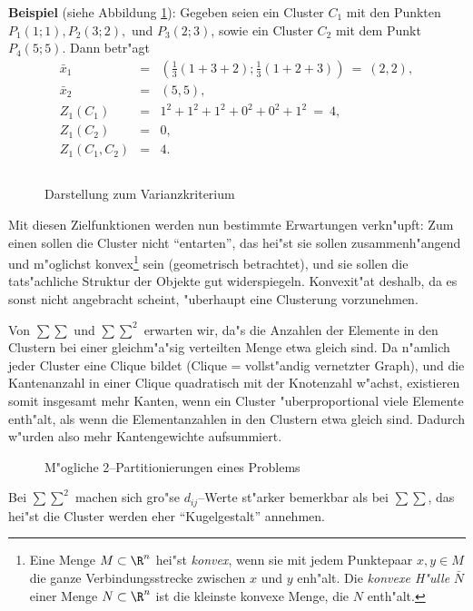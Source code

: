{\bf Beispiel} (siehe Abbildung \ref{varianzbild}):
Gegeben seien ein Cluster $C_1$ mit den Punkten $P_1(1;1), P_2(3;2),
$ und $P_3(2;3)$, sowie ein Cluster $C_2$ mit dem Punkt $P_4(5;5)$.
Dann betr"agt
\begin{eqnarray*}
\bar x_1 & = & \left(\frac 13 (1+3+2); \frac 13 (1+2+3) \right) \ = \
	(2,2),\\
\bar x_2 & = & (5,5),\\
Z_1(C_1) & = & 1^2 + 1^2 + 1^2+0^2+0^2+1^2 \ = \ 4,\\
Z_1(C_2) & = & 0,\\
Z_1(C_1,C_2) & = & 4.
\end{eqnarray*}

\begin{figure}[htbp]
\[\]
\caption{Darstellung zum Varianzkriterium \label{varianzbild}}
\end{figure}

Mit diesen Zielfunktionen werden nun bestimmte Erwartungen verkn"upft:
Zum einen sollen die Cluster nicht "`entarten"', das hei"st sie
sollen zusammenh"angend und m"oglichst konvex\footnote{Eine Menge
$M \subset \R^n$ hei"st {\em konvex}, wenn sie mit jedem Punktepaar 
$x,y \in M$ die ganze Verbindungsstrecke zwischen $x$ und $y$ enh"alt.
Die {\em konvexe H"ulle} $\bar N$ einer Menge $N \subset \R^n$  ist 
die kleinste konvexe Menge, die $N$ enth"alt.}
 sein (geometrisch 
betrachtet), und sie sollen die tats"achliche Struktur der Objekte
gut widerspiegeln. 
Konvexit"at deshalb, da es sonst nicht angebracht scheint, 
"uberhaupt eine Clusterung vorzunehmen.

Von $\sum\sum$ und $\sum\sum^2$ erwarten wir, da"s die Anzahlen der Elemente 
in den
Clustern bei einer gleichm"a"sig verteilten Menge etwa gleich sind.
Da n"amlich jeder Cluster eine Clique bildet (Clique = vollst"andig
vernetzter Graph), und die Kantenanzahl in einer Clique quadratisch
mit der Knotenzahl w"achst, existieren somit insgesamt mehr Kanten, wenn
ein Cluster "uberproportional viele Elemente enth"alt, als wenn die
Elementanzahlen in den Clustern etwa gleich sind. Dadurch w"urden
also mehr Kantengewichte aufsummiert.

\begin{figure}[htbp]
\begin{center}

\end{center}
\caption{M"ogliche 2--Partitionierungen eines Problems}
\end{figure}

Bei $\sum\sum^2$ machen sich gro"se $d_{ij}$--Werte st"arker bemerkbar als bei
$\sum\sum$, das hei"st die Cluster werden eher "`Kugelgestalt"' annehmen.

